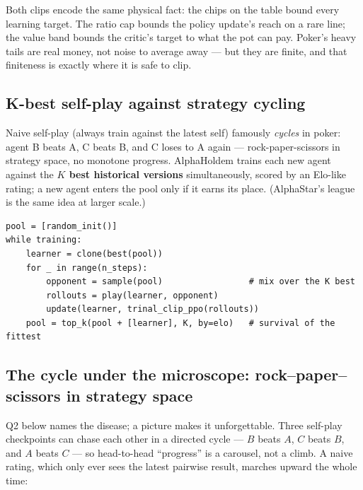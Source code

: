 \documentclass[11pt,a4paper]{article}
\begin{document}
Both clips encode the same physical fact: the chips on the table bound every
learning target. The ratio cap bounds the policy update's reach on a rare line;
the value band bounds the critic's target to what the pot can pay. Poker's heavy
tails are real money, not noise to average away --- but they are finite, and that
finiteness is exactly where it is safe to clip.

\subsection{K-best self-play against strategy cycling}

Naive self-play (always train against the latest self) famously
\emph{cycles} in poker: agent B beats A, C beats B, and C loses to A again ---
rock-paper-scissors in strategy space, no monotone progress. AlphaHoldem
trains each new agent against the \textbf{$K$ best historical versions}
simultaneously, scored by an Elo-like rating; a new agent enters the pool only
if it earns its place. (AlphaStar's league is the same idea at larger scale.)

\begin{lstlisting}[style=py, caption={K-best self-play.}]
pool = [random_init()]
while training:
    learner = clone(best(pool))
    for _ in range(n_steps):
        opponent = sample(pool)                 # mix over the K best
        rollouts = play(learner, opponent)
        update(learner, trinal_clip_ppo(rollouts))
    pool = top_k(pool + [learner], K, by=elo)   # survival of the fittest
\end{lstlisting}

\subsection{The cycle under the microscope: rock--paper--scissors in strategy space}

Q2 below names the disease; a picture makes it unforgettable. Three self-play
checkpoints can chase each other in a directed cycle --- $B$ beats $A$, $C$ beats
$B$, and $A$ beats $C$ --- so head-to-head ``progress'' is a carousel, not a
climb. A naive rating, which only ever sees the latest pairwise result, marches
upward the whole time:
\end{document}
